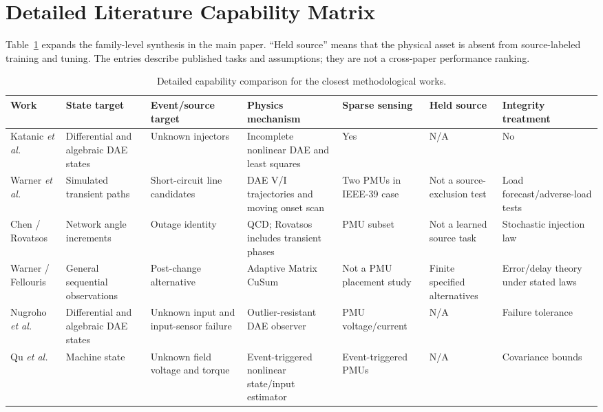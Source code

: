 \documentclass{ieeeaccess}
\begin{document}
\appendices



\section{Detailed Literature Capability Matrix}

Table~\ref{tab:supp-literature} expands the family-level synthesis in the main paper. ``Held source'' means that the physical asset is absent from source-labeled training and tuning. The entries describe published tasks and assumptions; they are not a cross-paper performance ranking.

\begin{table}[t]
\caption{Detailed capability comparison for the closest methodological works.}
\label{tab:supp-literature}
\centering
\scriptsize
\begin{tabularx}{\textwidth}{@{}lXXXXXX@{}}
\toprule
Work & State target & Event/source target & Physics mechanism & Sparse sensing & Held source & Integrity treatment \\
\midrule
Katanic \emph{et al.} \cite{katanic2024recursive} & Differential and algebraic DAE states & Unknown injectors & Incomplete nonlinear DAE and least squares & Yes & N/A & No \\
Warner \emph{et al.} \cite{warner2023highfidelity} & Simulated transient paths & Short-circuit line candidates & DAE V/I trajectories and moving onset scan & Two PMUs in IEEE-39 case & Not a source-exclusion test & Load forecast/adverse-load tests \\
Chen / Rovatsos \cite{chen2016quickest,rovatsos2017outage} & Network angle increments & Outage identity & QCD; Rovatsos includes transient phases & PMU subset & Not a learned source task & Stochastic injection law \\
Warner / Fellouris \cite{warner2024matrix} & General sequential observations & Post-change alternative & Adaptive Matrix CuSum & Not a PMU placement study & Finite specified alternatives & Error/delay theory under stated laws \\
Nugroho \emph{et al.} \cite{nugroho2022dae} & Differential and algebraic DAE states & Unknown input and input-sensor failure & Outlier-resistant DAE observer & PMU voltage/current & N/A & Failure tolerance \\
Qu \emph{et al.} \cite{qu2023joint} & Machine state & Unknown field voltage and torque & Event-triggered nonlinear state/input estimator & Event-triggered PMUs & N/A & Covariance bounds \\

\end{tabularx}
\end{table}
\end{document}
